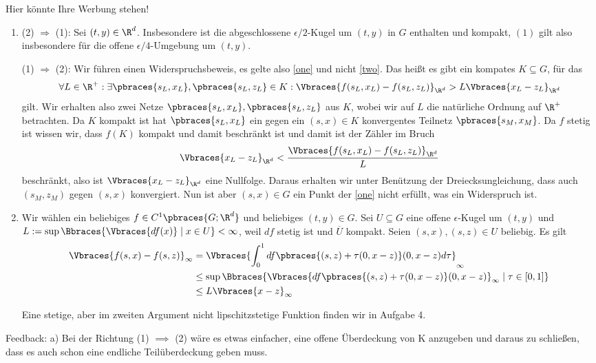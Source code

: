 \begin{solution}
  Hier könnte Ihre Werbung stehen!

  \begin{enumerate}[label = \alph*)]
    \item
    (2) $\Rightarrow$ (1): Sei $(t, y) \in \R^d$.
    Insbesondere ist die abgeschlossene $\epsilon /2$-Kugel um $(t,y)$ in $G$ enthalten und kompakt, $(1)$ gilt also insbesondere für die offene $\epsilon /4$-Umgebung um $(t,y)$.

    (1) $\Rightarrow$ (2):
    Wir führen einen Widerspruchsbeweis, es gelte also \ref{one} und nicht \ref{two}. Das heißt es gibt ein kompates $K \subseteq G$, für das
    \begin{align*}
      \forall L \in \R^+: \exists \pbraces{s_L,x_L}, \pbraces{s_L, z_L} \in K: \Vbraces{f(s_L,x_L) - f(s_L,z_L)}_{\R^d} > L \Vbraces{x_L - z_L}_{\R^d}
    \end{align*}
    gilt. Wir erhalten also zwei Netze $\pbraces{s_L,x_L}, \pbraces{s_L, z_L}$ aus $K$, wobei wir auf $L$ die natürliche Ordnung auf $\R^+$ betrachten. Da $K$ kompakt ist hat $\pbraces{s_L,x_L}$ ein gegen ein $(s,x) \in K$ konvergentes Teilnetz $\pbraces{s_M, x_M}$. Da $f$ stetig ist wissen wir, dass $f(K)$ kompakt und damit beschränkt ist und damit ist der Zähler im Bruch
    \begin{align*}
      \Vbraces{x_L - z_L}_{\R^d} < \frac{\Vbraces{f(s_L,x_L) - f(s_L,z_L)}_{\R^d}}{L}
    \end{align*}
    beschränkt, also ist $\Vbraces{x_L - z_L}_{\R^d}$ eine Nullfolge. Daraus erhalten wir unter Benützung der Dreiecksungleichung, dass auch $(s_M,z_M)$ gegen $(s,x)$ konvergiert. Nun ist aber $(s,x) \in G$ ein Punkt der \ref{one} nicht erfüllt, was ein Widerspruch ist.

    \item Wir wählen ein beliebiges $f \in C^1\pbraces{G; \R^d}$ und beliebiges $(t,y) \in G$. Sei $U \subseteq G$ eine offene $\epsilon$-Kugel um $(t,y)$ und $L := \sup\Bbraces{\Vbraces{df(x)} \mid x \in U } < \infty$, weil $df$ stetig ist und $\overline{U}$ kompakt. Seien $(s,x), (s,z) \in U$ beliebig. Es gilt
    \begin{align*}
      \Vbraces{f(s,x) - f(s,z)}_\infty &= \Vbraces{\int_0^1 df\pbraces{(s,z) + \tau (0, x - z)} (0, x - z) d\tau }_\infty \\
      &\leq \sup\Bbraces{ \Vbraces{df\pbraces{(s,z) + \tau (0, x - z)} (0, x - z)}_\infty \mid \tau \in [0,1] } \\
      &\leq L \Vbraces{x - z}_\infty
    \end{align*}

    Eine stetige, aber im zweiten Argument nicht lipschitzstetige Funktion finden wir in Aufgabe 4.
  \end{enumerate}

Feedback:
a) Bei der Richtung (1) $\implies$ (2) wäre es etwas einfacher, eine offene Überdeckung von K anzugeben und daraus zu schließen, dass es auch schon eine endliche Teilüberdeckung geben muss.

\end{solution}
